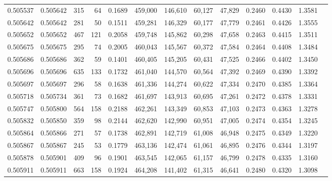 \begin{tabular}{rrrrrrrrrrrrr}
0.505537 & 0.505642 &   315 &    64 &                                     0.1689 & 459,000 & 146,610 &  60,127 &  47,829 & 0.2460 & 0.4430 & 1.3581 \\
0.505642 & 0.505642 &   281 &    50 &                                     0.1511 & 459,281 & 146,329 &  60,177 &  47,779 & 0.2461 & 0.4426 & 1.3555 \\
0.505652 & 0.505652 &   467 &   121 &                                     0.2058 & 459,748 & 145,862 &  60,298 &  47,658 & 0.2463 & 0.4415 & 1.3511 \\
0.505675 & 0.505675 &   295 &    74 &                                     0.2005 & 460,043 & 145,567 &  60,372 &  47,584 & 0.2464 & 0.4408 & 1.3484 \\
0.505686 & 0.505686 &   362 &    59 &                                     0.1401 & 460,405 & 145,205 &  60,431 &  47,525 & 0.2466 & 0.4402 & 1.3450 \\
0.505696 & 0.505696 &   635 &   133 &                                     0.1732 & 461,040 & 144,570 &  60,564 &  47,392 & 0.2469 & 0.4390 & 1.3392 \\
0.505697 & 0.505697 &   296 &    58 &                                     0.1638 & 461,336 & 144,274 &  60,622 &  47,334 & 0.2470 & 0.4385 & 1.3364 \\
0.505718 & 0.505734 &   361 &    73 &                                     0.1682 & 461,697 & 143,913 &  60,695 &  47,261 & 0.2472 & 0.4378 & 1.3331 \\
0.505747 & 0.505800 &   564 &   158 &                                     0.2188 & 462,261 & 143,349 &  60,853 &  47,103 & 0.2473 & 0.4363 & 1.3278 \\
0.505832 & 0.505850 &   359 &    98 &                                     0.2144 & 462,620 & 142,990 &  60,951 &  47,005 & 0.2474 & 0.4354 & 1.3245 \\
0.505864 & 0.505866 &   271 &    57 &                                     0.1738 & 462,891 & 142,719 &  61,008 &  46,948 & 0.2475 & 0.4349 & 1.3220 \\
0.505867 & 0.505867 &   245 &    53 &                                     0.1779 & 463,136 & 142,474 &  61,061 &  46,895 & 0.2476 & 0.4344 & 1.3197 \\
0.505878 & 0.505901 &   409 &    96 &                                     0.1901 & 463,545 & 142,065 &  61,157 &  46,799 & 0.2478 & 0.4335 & 1.3160 \\
0.505911 & 0.505911 &   663 &   158 &                                     0.1924 & 464,208 & 141,402 &  61,315 &  46,641 & 0.2480 & 0.4320 & 1.3098 \\

\end{tabular}
